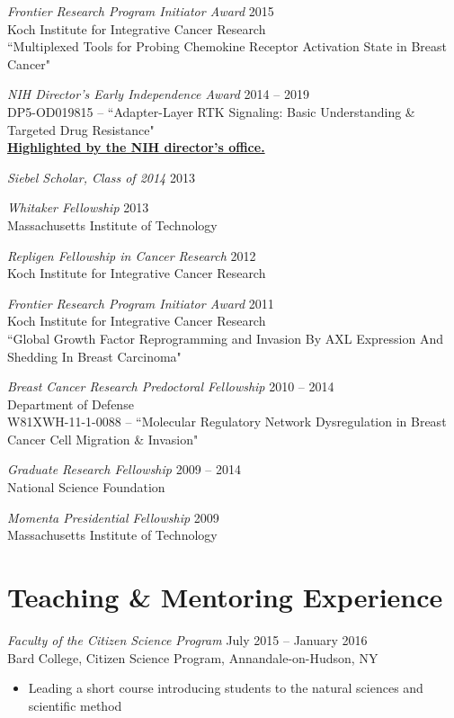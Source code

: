 \documentclass[11pt]{res}
\begin{document}
\begin{resume}
{\sl Frontier Research Program Initiator Award} \hfill 2015 \\
Koch Institute for Integrative Cancer Research\\
``Multiplexed Tools for Probing Chemokine Receptor Activation State in Breast Cancer"

{\sl NIH Director's Early Independence Award}  \hfill 2014 -- 2019 \\
DP5-OD019815 -- ``Adapter-Layer RTK Signaling: Basic Understanding \& Targeted Drug Resistance" \\
{\bf \href{https://directorsblog.nih.gov/2014/10/28/creative-minds-tackling-chemotherapy-resistance/}{Highlighted by the NIH director's office.}}

{\sl Siebel Scholar, Class of 2014} \hfill 2013 

{\sl Whitaker Fellowship}  \hfill 2013\\
Massachusetts Institute of Technology

{\sl Repligen Fellowship in Cancer Research} \hfill 2012 \\
Koch Institute for Integrative Cancer Research 

{\sl Frontier Research Program Initiator Award} \hfill 2011 \\
Koch Institute for Integrative Cancer Research\\
``Global Growth Factor Reprogramming and Invasion By AXL Expression And Shedding In Breast Carcinoma"

{\sl Breast Cancer Research Predoctoral Fellowship} \hfill 2010 -- 2014 \\
Department of Defense\\
W81XWH-11-1-0088 -- ``Molecular Regulatory Network Dysregulation in Breast Cancer Cell Migration \& Invasion"

{\sl Graduate Research Fellowship}  \hfill 2009 -- 2014 \\
National Science Foundation

{\sl Momenta Presidential Fellowship} \hfill 2009 \\
Massachusetts Institute of Technology



\section{Teaching \& Mentoring Experience}

{\sl Faculty of the Citizen Science Program} \hfill July 2015 -- January 2016 \\
Bard College, Citizen Science Program, Annandale-on-Hudson, NY	
\begin{itemize} \itemsep -2pt %
\item Leading a short course introducing students to the natural sciences and scientific method
\end{itemize}


\end{resume}
\end{document}
